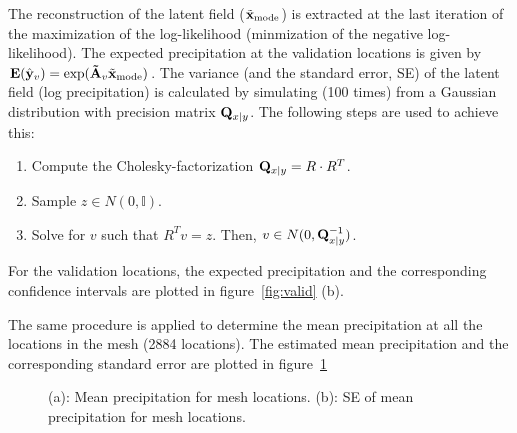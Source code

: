 \documentclass[a4paper,10pt]{article}
\def\bE{{\bf E}}
\def\bQ{{\bf Q}}
\def\btA{{\bf \tilde A}}
\def\bx{{\bf x}}
\def\by{{\bf y}}
\def\txmode{{\tilde \bx_{\mathrm{mode}}}}
\begin{document}
The reconstruction of the latent field ($\txmode$) is extracted at the last iteration of the maximization of the log-likelihood (minmization of the negative log-likelihood). The expected precipitation at the validation locations is given by $\bE(\hat \by_v) = \exp(\btA_v \txmode)$. The variance (and the standard error, SE) of the latent field (log precipitation) is calculated by simulating (100 times) from a Gaussian distribution with precision matrix $\bQ_{x|y}$. The following steps are used to achieve this:
\begin{enumerate}
 \item Compute the Cholesky-factorization $\bQ_{x|y} = R\cdot R^T$.
 \item Sample $z \in N(0,\mathbb{I})$.
 \item Solve for $v$ such that $R^T v = z$. Then, $v \in N(0,\bQ_{x|y}^{-1})$.
\end{enumerate} 
For the validation locations, the expected precipitation and the corresponding confidence intervals are plotted in figure~\ref{fig:valid} (b).

The same procedure is applied to determine the mean precipitation at all the locations in the mesh (2884 locations). The estimated mean precipitation and the corresponding standard error are plotted in figure~\ref{fig:mesh}
\begin{figure}[ht]
\centering
  \qquad
  \caption{(a): Mean precipitation for mesh locations. (b): SE of mean precipitation for mesh locations.}
\label{fig:mesh}
\end{figure}
\end{document}
